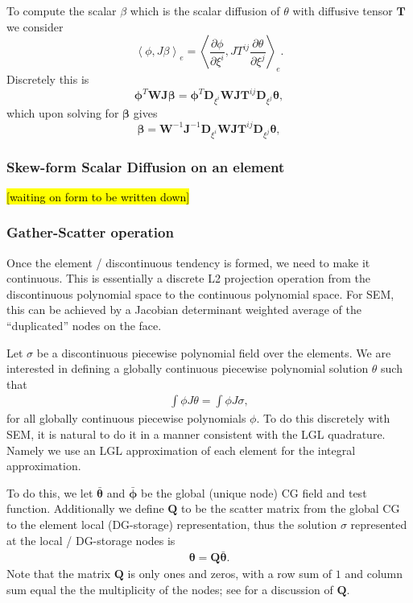 \documentclass{report}
\newcommand{\inner}[2]{ \left\langle #1, #2 \right\rangle }
\newcommand{\mat}[1]{\boldsymbol #1}
\newcommand{\dvec}[1]{\boldsymbol #1}
\begin{document}
To compute the scalar $\beta$ which is the scalar diffusion of $\theta$
with diffusive tensor $\mat{T}$ we consider
\begin{equation}
  \inner{\phi}{J\beta}_{e}
  =
  \inner{\frac{\partial \phi}{\partial \xi^{i}}}{J T^{ij} \frac{\partial\theta}{\partial \xi^j}}_{e}.
\end{equation}
Discretely this is
\begin{equation}
  \dvec{\phi}^{T} \mat{W} \mat{J} \dvec{\beta}
  =
  \dvec{\phi}^{T} \mat{D}_{\xi^{i}} \mat{W} \mat{J} \mat{T}^{ij} \mat{D}_{\xi^{j}}\dvec{\theta},
\end{equation}
which upon solving for $\dvec{\beta}$ gives
\begin{equation}
  \dvec{\beta}
  =
  \mat{W}^{-1} \mat{J}^{-1} \mat{D}_{\xi^{i}} \mat{W} \mat{J} \mat{T}^{ij} \mat{D}_{\xi^{j}}\dvec{\theta},
\end{equation}

\subsubsection*{Skew-form Scalar Diffusion on an element}

\hl{[waiting on form to be written down]}

\subsubsection*{Gather-Scatter operation}
Once the element / discontinuous tendency is formed, we need to make it continuous.
This is essentially a discrete L2 projection operation from the discontinuous polynomial space
to the continuous polynomial space. For SEM, this can be achieved by a Jacobian determinant
weighted average of the ``duplicated'' nodes on the face.

Let $\sigma$ be a discontinuous piecewise polynomial field over the elements.
We are interested in defining a globally continuous piecewise polynomial solution $\theta$
such that
\begin{align}
  \int \phi J \theta = \int \phi J \sigma,
\end{align}
for all globally continuous piecewise polynomials $\phi$.
To do this discretely with SEM, it is natural to do it in a manner consistent with the LGL quadrature.
Namely we use an LGL approximation of each element for the integral approximation.

To do this, we let
$\bar{\dvec{\theta}}$ and $\bar{\dvec{\phi}}$
be the
global (unique node) CG field and test function. Additionally we define $\mat{Q}$ to be the scatter matrix
from the global CG to the element local (DG-storage) representation, thus the
solution $\sigma$ represented at the local / DG-storage nodes is
\begin{align}
    \label{eqn:DGCGProj}
    \dvec{\theta} = \mat{Q} \bar{\dvec{\theta}}.
\end{align}
Note that the matrix $\mat{Q}$ is only ones and zeros, with a row sum of $1$ and
column sum equal the the multiplicity of the nodes;
see \citet[page 192ff]{deville_fischer_mund_2002} for a discussion of $\mat{Q}$.
\end{document}
